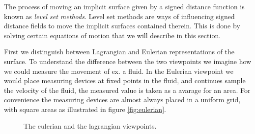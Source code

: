 The process of moving an implicit surface given by a signed distance function is known as \emph{level set methods}. Level set methods are ways of influencing signed distance fields to move the implicit surfaces contained therein. This is done by solving certain equations of motion that we will describe in this section.

First we distinguish between Lagrangian and Eulerian representations of the surface.
To understand the difference between the two viewpoints we
imagine how we could measure the movement of ex. a fluid. In the Eulerian
viewpoint we would place measuring devices at fixed points in the
fluid, and continues sample the velocity of the fluid, the measured
value is taken as a avarage for an area. For convenience the
measuring devices are almost always placed in a uniform grid, with
square areas as illustrated in figure \ref{fig:eulerian}.

\begin{figure}[h]
  \centering
  \caption{The eulerian and the lagrangian viewpoints.}
  \label{fig:eulerian-lagrangian}
\end{figure}

